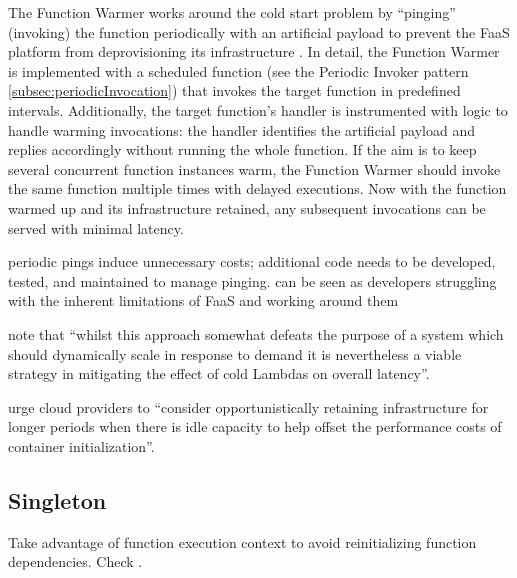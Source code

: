 The Function Warmer works around the cold start problem by ``pinging'' (invoking) the function periodically with an artificial payload to prevent the FaaS platform from deprovisioning its infrastructure \parencite{leitner18industrialpractice}. In detail, the Function Warmer is implemented with a scheduled function (see the Periodic Invoker pattern \ref{subsec:periodicInvocation}) that invokes the target function in predefined intervals. Additionally, the target function's handler is instrumented with logic to handle warming invocations: the handler identifies the artificial payload and replies accordingly without running the whole function. If the aim is to keep several concurrent function instances warm, the Function Warmer should invoke the same function multiple times with delayed executions. Now with the function warmed up and its infrastructure retained, any subsequent invocations can be served with minimal latency.


periodic pings induce unnecessary costs; additional code needs to be developed, tested, and maintained to manage pinging.
can be seen as developers struggling with the inherent limitations of FaaS and working around them \parencite{leitner18industrialpractice}

\textcite{bardsley18optimizationStrategies} note that ``whilst this approach somewhat defeats the purpose of a system which should dynamically scale in response to demand it is nevertheless a viable strategy in mitigating the effect of cold Lambdas on overall latency''.

\textcite{lloydserverless} urge cloud providers to ``consider opportunistically retaining infrastructure for longer periods when there is idle capacity to help offset the performance costs of container initialization''.



\subsection{Singleton} \label{subsec:Singleton}

Take advantage of function execution context to avoid reinitializing function dependencies. Check \textcite{aws18serverlessLens}.

